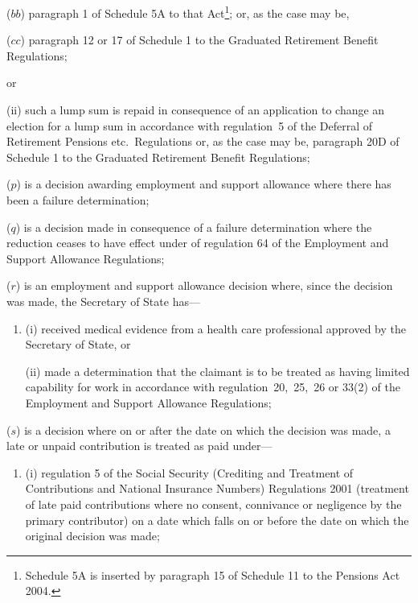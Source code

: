 \documentclass[12pt,a4paper]{article}
\begin{document}
\begin{enumerate}
\begin{enumerate}
\begin{enumerate}
($bb$) paragraph 1 of Schedule 5A to that Act\footnote{Schedule 5A is inserted by paragraph 15 of Schedule 11 to the Pensions Act 2004.}; or, as the case may be,

($cc$) paragraph 12 or 17 of Schedule 1 to the Graduated Retirement Benefit Regulations;
\end{enumerate}
or

(ii) such a lump sum is repaid in consequence of an application to change an election for a lump sum in accordance with regulation~5 of the Deferral of Retirement Pensions etc.\ Regulations or, as the case may be, paragraph 20D of Schedule 1 to the Graduated Retirement Benefit Regulations;
\end{enumerate}

($p$) is a decision awarding employment and support allowance where there has been a failure determination;

($q$) is a decision made in consequence of a failure determination where the reduction ceases to have effect under of regulation 64 of the Employment and Support Allowance Regulations;


($r$) is an employment and support allowance decision where, since the decision was made, the Secretary of State has—
\begin{enumerate}\item[]
(i) received medical evidence from a health care professional approved by the Secretary of State, or

(ii) made a determination that the claimant is to be treated as having limited capability for work in accordance with regulation~20,~25,~26 or 33(2) of the Employment and Support Allowance Regulations;
\end{enumerate}

($s$) is a decision where on or after the date on which the decision was made, a late or unpaid contribution is treated as paid under—
\begin{enumerate}\item[]
(i) regulation 5 of the Social Security (Crediting and Treatment of Contributions and National Insurance Numbers) Regulations 2001 (treatment of late paid contributions where no consent, connivance or negligence by the primary contributor) on a date which falls on or before the date on which the original decision was made;


\end{enumerate}
\end{enumerate}
\end{document}
